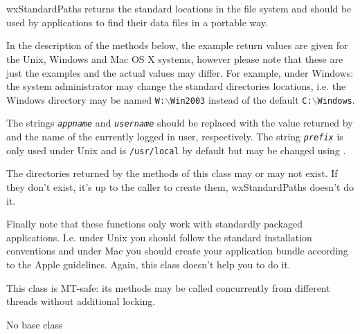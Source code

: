 
\section{}\label{wxstandardpaths}

wxStandardPaths returns the standard locations in the file system and should be
used by applications to find their data files in a portable way.

In the description of the methods below, the example return values are given
for the Unix, Windows and Mac OS X systems, however please note that these are
just the examples and the actual values may differ. For example, under Windows:
the system administrator may change the standard directories locations, i.e.
the Windows directory may be named \texttt{W:$\backslash$Win2003} instead of
the default \texttt{C:$\backslash$Windows}.

The strings \texttt{\textit{appname}} and \texttt{\textit{username}} should be
replaced with the value returned by 
and the name of the currently logged in user, respectively. The string
\texttt{\textit{prefix}} is only used under Unix and is \texttt{/usr/local} by
default but may be changed using .

The directories returned by the methods of this class may or may not exist. If
they don't exist, it's up to the caller to create them, wxStandardPaths doesn't
do it.

Finally note that these functions only work with standardly packaged
applications. I.e. under Unix you should follow the standard installation
conventions and under Mac you should create your application bundle according
to the Apple guidelines. Again, this class doesn't help you to do it.

This class is MT-safe: its methods may be called concurrently from different
threads without additional locking.


No base class

